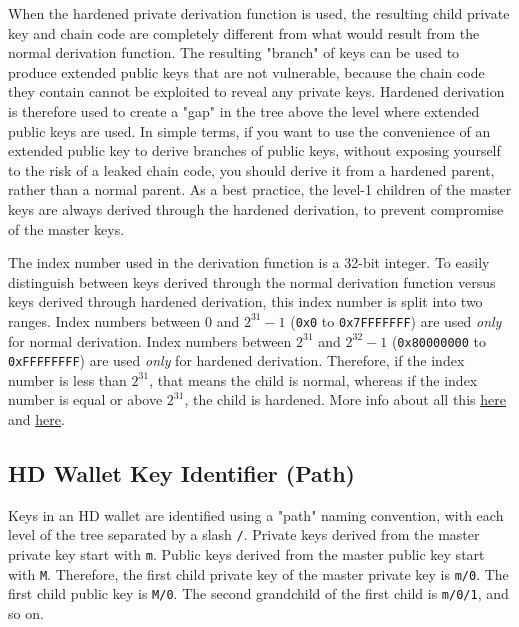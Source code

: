 \documentclass{article}
\begin{document}
    When the hardened private derivation function is used, the resulting child private key and chain code are completely different from what would result from the normal derivation function. The resulting "branch" of keys can be used to produce extended public keys that are not vulnerable, because the chain code they contain cannot be exploited to reveal any private keys. Hardened derivation is therefore used to create a "gap" in the tree above the level where extended public keys are used. In simple terms, if you want to use the convenience of an extended public key to derive branches of public keys, without exposing yourself to the risk of a leaked chain code, you should derive it from a hardened parent, rather than a normal parent. As a best practice, the level-1 children of the master keys are always derived through the hardened derivation, to prevent compromise of the master keys.

    The index number used in the derivation function is a 32-bit integer. To easily distinguish between keys derived through the normal derivation function versus keys derived through hardened derivation, this index number is split into two ranges. Index numbers between $0$ and $2^{31}-1$ (\texttt{0x0} to \texttt{0x7FFFFFFF}) are used \textit{only} for normal derivation. Index numbers between $2^{31}$ and $2^{32}-1$ (\texttt{0x80000000} to \texttt{0xFFFFFFFF}) are used \textit{only} for hardened derivation. Therefore, if the index number is less than $2^{31}$, that means the child is normal, whereas if the index number is equal or above $2^{31}$, the child is hardened. More info about all this \href{https://learnmeabitcoin.com/technical/extended-keys}{here} and \href{https://www.oreilly.com/library/view/mastering-bitcoin/9781491902639/ch04.html#public_key_derivation}{here}.

  \subsection{HD Wallet Key Identifier (Path)}

    Keys in an HD wallet are identified using a "path" naming convention, with each level of the tree separated by a slash \texttt{/}. Private keys derived from the master private key start with \texttt{m}. Public keys derived from the master public key start with \texttt{M}. Therefore, the first child private key of the master private key is \texttt{m/0}. The first child public key is \texttt{M/0}. The second grandchild of the first child is \texttt{m/0/1}, and so on.
\end{document}

